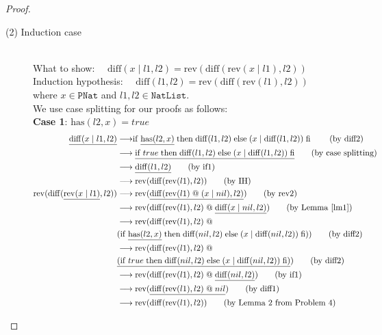 \documentclass[12pt, a4paper]{article}
\newcommand{\rel}[1]{\mathrel{#1}}
\newcommand{\rmx}[1]{\mathrm{#1}}
\newcommand{\larrow}{\longrightarrow}
\newcommand{\under}{\underline}
\begin{document}
\begin{proof}
\begin{description}
\item[(2) Induction case]~\\
What to show: $\quad \rmx{diff}(x \rel{|} l1, l2) = \rmx{rev}(\rmx{diff}(\rmx{rev}(x \rel{|} l1), l2))$ \\
Induction hypothesis: $\quad \rmx{diff}(l1, l2) = \rmx{rev}(\rmx{diff}(\rmx{rev}(l1), l2))$  \\
where $x \in \mathtt{PNat}$ and $l1, l2 \in \mathtt{NatList}$. \\
We use case splitting for our proofs as follows: \\
\textbf{Case 1}: $\rmx{has}(l2, x) = true$
\begin{align*}
\under{\rmx{diff}(x \rel{|} l1, l2)}
	&\larrow \rel{\rmx{if}} \under{\rmx{has}(l2, x)} \rel{\rmx{then}} \rmx{diff}(l1, l2) \rel{\rmx{else}} (x \rel{|} \rmx{diff}(l1, l2)) \rel{\rmx{fi}} \tag{by diff2} \\
	&\larrow \under{\rel{\rmx{if}} true \rel{\rmx{then}} \rmx{diff}(l1, l2) \rel{\rmx{else}} (x \rel{|} \rmx{diff}(l1, l2)) \rel{\rmx{fi}}} \tag{by case splitting} \\
	&\larrow \under{\rmx{diff}(l1, l2)} \tag{by if1} \\
	&\larrow \rmx{rev}(\rmx{diff}(\rmx{rev}(l1), l2)) \tag{by IH} \\
\rmx{rev}(\rmx{diff}(\under{\rmx{rev}(x \rel{|} l1)}, l2)) 
	&\larrow  \rmx{rev}(\under{\rmx{diff}(\rmx{rev}(l1) \rel{@} (x \rel{|} nil), l2)}) \tag{by rev2} \\
	&\larrow  \rmx{rev}(\rmx{diff}(\rmx{rev}(l1), l2) \rel{@} \under{\rmx{diff}(x \rel{|} nil, l2)}) \tag{by Lemma~\ref{lm1}} \\
	&\larrow  \rmx{rev}(\rmx{diff}(\rmx{rev}(l1), l2) \rel{@} \\
	&(\rel{\rmx{if}} \under{\rmx{has}(l2, x)} \rel{\rmx{then}} \rmx{diff}(nil, l2) \rel{\rmx{else}} (x \rel{|} \rmx{diff}(nil, l2)) \rel{\rmx{fi}})) \tag{by diff2} \\
	&\larrow  \rmx{rev}(\rmx{diff}(\rmx{rev}(l1), l2) \rel{@} \\
	&\under{(\rel{\rmx{if}} true \rel{\rmx{then}} \rmx{diff}(nil, l2) \rel{\rmx{else}} (x \rel{|} \rmx{diff}(nil, l2)) \rel{\rmx{fi}})}) \tag{by diff2} \\
	&\larrow  \rmx{rev}(\rmx{diff}(\rmx{rev}(l1), l2) \rel{@} \under{\rmx{diff}(nil, l2)}) \tag{by if1} \\
	&\larrow  \rmx{rev}(\under{\rmx{diff}(\rmx{rev}(l1), l2) \rel{@} nil}) \tag{by diff1} \\
	&\larrow  \rmx{rev}(\rmx{diff}(\rmx{rev}(l1), l2)) \tag{by Lemma 2 from Problem 4}
\end{align*}


\end{description}
\end{proof}
\end{document}
